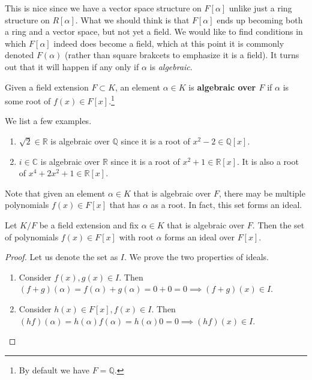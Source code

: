  This is nice since we have a vector space structure on $F[\alpha]$ unlike just a ring structure on $R[\alpha]$. What we should think is that $F[\alpha]$ ends up becoming both a ring and a vector space, but not yet a field. We would like to find conditions in which $F[\alpha]$ indeed does become a field, which at this point it is commonly denoted $F(\alpha)$ (rather than square brakcets to emphasize it is a field). It turns out that it will happen if any only if $\alpha$ is \textit{algebraic}.  

  \begin{definition}
    Given a field extension $F \subset K$, an element $\alpha \in K$ is \textbf{algebraic over $F$} if $\alpha$ is some root of $f(x) \in F[x]$.\footnote{By default we have $F = \mathbb{Q}$.}
  \end{definition}

  \begin{example}
    We list a few examples. 
    \begin{enumerate}
      \item $\sqrt{2} \in \mathbb{R}$ is algebraic over $\mathbb{Q}$ since it is a root of $x^2 - 2 \in \mathbb{Q}[x]$. 
      \item $i \in \mathbb{C}$ is algebraic over $\mathbb{R}$ since it is a root of $x^2 + 1 \in \mathbb{R}[x]$. It is also a root of $x^4 + 2 x^2 + 1 \in \mathbb{R}[x]$. 
    \end{enumerate}
  \end{example}

  Note that given an element $\alpha \in K$ that is algebraic over $F$, there may be multiple polynomials $f(x) \in F[x]$ that has $\alpha$ as a root. In fact, this set forms an ideal. 

  \begin{lemma}
    Let $K/F$ be a field extension and fix $\alpha \in K$ that is algebraic over $F$. Then the set of polynomials $f(x) \in F[x]$ with root $\alpha$ forms an ideal over $F[x]$. 
  \end{lemma}
  \begin{proof}
    Let us denote the set as $I$. We prove the two properties of ideals.  
    \begin{enumerate}
      \item Consider $f(x), g(x) \in I$. Then $(f + g)(\alpha) = f(\alpha) + g(\alpha) = 0 + 0 = 0 \implies (f + g)(x) \in I$. 
      \item Consider $h(x) \in F[x], f(x) \in I$. Then $(hf)(\alpha) = h(\alpha) f(\alpha) = h(\alpha) 0 = 0 \implies (hf)(x) \in I$. 
    \end{enumerate}
  \end{proof}

